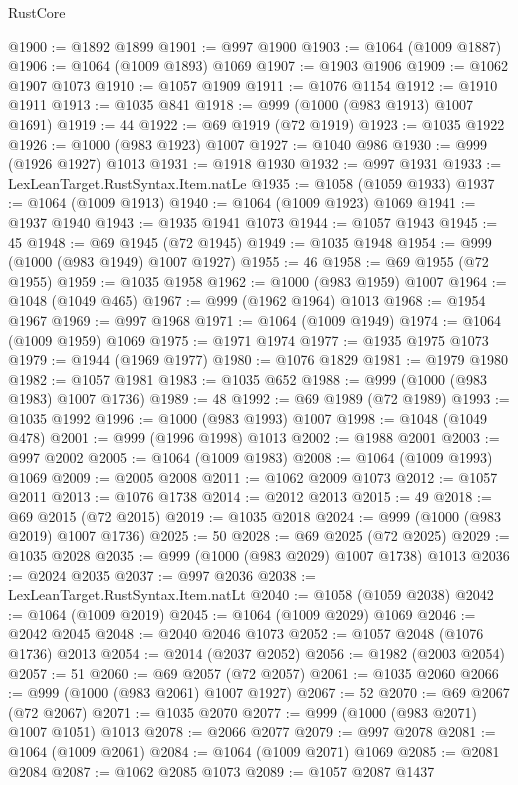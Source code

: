 \begin{lexlean}{RustCore}
\begin{coremodule}
@1900 := @1892 @1899
@1901 := @997 @1900
@1903 := @1064 (@1009 @1887)
@1906 := @1064 (@1009 @1893) @1069
@1907 := @1903 @1906
@1909 := @1062 @1907 @1073
@1910 := @1057 @1909
@1911 := @1076 @1154
@1912 := @1910 @1911
@1913 := @1035 @841
@1918 := @999 (@1000 (@983 @1913) @1007 @1691)
@1919 := 44
@1922 := @69 @1919 (@72 @1919)
@1923 := @1035 @1922
@1926 := @1000 (@983 @1923) @1007
@1927 := @1040 @986
@1930 := @999 (@1926 @1927) @1013
@1931 := @1918 @1930
@1932 := @997 @1931
@1933 := LexLeanTarget.RustSyntax.Item.natLe
@1935 := @1058 (@1059 @1933)
@1937 := @1064 (@1009 @1913)
@1940 := @1064 (@1009 @1923) @1069
@1941 := @1937 @1940
@1943 := @1935 @1941 @1073
@1944 := @1057 @1943
@1945 := 45
@1948 := @69 @1945 (@72 @1945)
@1949 := @1035 @1948
@1954 := @999 (@1000 (@983 @1949) @1007 @1927)
@1955 := 46
@1958 := @69 @1955 (@72 @1955)
@1959 := @1035 @1958
@1962 := @1000 (@983 @1959) @1007
@1964 := @1048 (@1049 @465)
@1967 := @999 (@1962 @1964) @1013
@1968 := @1954 @1967
@1969 := @997 @1968
@1971 := @1064 (@1009 @1949)
@1974 := @1064 (@1009 @1959) @1069
@1975 := @1971 @1974
@1977 := @1935 @1975 @1073
@1979 := @1944 (@1969 @1977)
@1980 := @1076 @1829
@1981 := @1979 @1980
@1982 := @1057 @1981
@1983 := @1035 @652
@1988 := @999 (@1000 (@983 @1983) @1007 @1736)
@1989 := 48
@1992 := @69 @1989 (@72 @1989)
@1993 := @1035 @1992
@1996 := @1000 (@983 @1993) @1007
@1998 := @1048 (@1049 @478)
@2001 := @999 (@1996 @1998) @1013
@2002 := @1988 @2001
@2003 := @997 @2002
@2005 := @1064 (@1009 @1983)
@2008 := @1064 (@1009 @1993) @1069
@2009 := @2005 @2008
@2011 := @1062 @2009 @1073
@2012 := @1057 @2011
@2013 := @1076 @1738
@2014 := @2012 @2013
@2015 := 49
@2018 := @69 @2015 (@72 @2015)
@2019 := @1035 @2018
@2024 := @999 (@1000 (@983 @2019) @1007 @1736)
@2025 := 50
@2028 := @69 @2025 (@72 @2025)
@2029 := @1035 @2028
@2035 := @999 (@1000 (@983 @2029) @1007 @1738) @1013
@2036 := @2024 @2035
@2037 := @997 @2036
@2038 := LexLeanTarget.RustSyntax.Item.natLt
@2040 := @1058 (@1059 @2038)
@2042 := @1064 (@1009 @2019)
@2045 := @1064 (@1009 @2029) @1069
@2046 := @2042 @2045
@2048 := @2040 @2046 @1073
@2052 := @1057 @2048 (@1076 @1736) @2013
@2054 := @2014 (@2037 @2052)
@2056 := @1982 (@2003 @2054)
@2057 := 51
@2060 := @69 @2057 (@72 @2057)
@2061 := @1035 @2060
@2066 := @999 (@1000 (@983 @2061) @1007 @1927)
@2067 := 52
@2070 := @69 @2067 (@72 @2067)
@2071 := @1035 @2070
@2077 := @999 (@1000 (@983 @2071) @1007 @1051) @1013
@2078 := @2066 @2077
@2079 := @997 @2078
@2081 := @1064 (@1009 @2061)
@2084 := @1064 (@1009 @2071) @1069
@2085 := @2081 @2084
@2087 := @1062 @2085 @1073
@2089 := @1057 @2087 @1437

\end{coremodule}
\end{lexlean}
